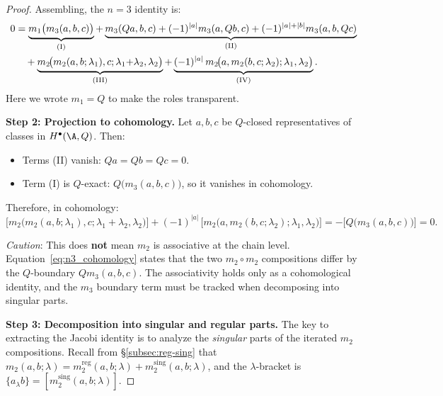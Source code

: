 \begin{proof}
Assembling, the $n=3$ identity is:
\begin{align}
0 &= \underbrace{m_1\bigl(m_3(a,b,c)\bigr)}_{\text{(I)}}
 + \underbrace{m_3(Qa,b,c) + (-1)^{|a|} m_3(a,Qb,c) + (-1)^{|a|+|b|} m_3(a,b,Qc)}_{\text{(II)}} \notag\\
 &\quad + \underbrace{m_2\!\bigl(m_2(a,b;\lambda_1),c;\lambda_1{+}\lambda_2,\lambda_2\bigr)}_{\text{(III)}}
 + \underbrace{(-1)^{|a|}\, m_2\!\bigl(a,m_2(b,c;\lambda_2);\lambda_1,\lambda_2\bigr)}_{\text{(IV)}}.
\end{align}
Here we wrote $m_1 = Q$ to make the roles transparent.

\medskip
\textbf{Step 2: Projection to cohomology.}
Let $a,b,c$ be $Q$-closed representatives of classes in $H^\bullet(\A,Q)$. Then:
\begin{itemize}
\item Terms (II) vanish: $Qa = Qb = Qc = 0$.
\item Term (I) is $Q$-exact: $Q\bigl(m_3(a,b,c)\bigr)$, so it vanishes in cohomology.
\end{itemize}
Therefore, in cohomology:
\begin{equation}
\bigl[m_2\!\bigl(m_2(a,b;\lambda_1),c;\lambda_1{+}\lambda_2,\lambda_2\bigr)\bigr]
+ (-1)^{|a|}\,\bigl[m_2\!\bigl(a,m_2(b,c;\lambda_2);\lambda_1,\lambda_2\bigr)\bigr]
= -\bigl[Q\bigl(m_3(a,b,c)\bigr)\bigr] = 0.
\end{equation}

\emph{Caution}: This does \textbf{not} mean $m_2$ is associative at the
chain level. Equation~\eqref{eq:n3_cohomology} states that the two
$m_2 \circ m_2$ compositions differ by the $Q$-boundary
$Qm_3(a,b,c)$. The associativity holds only as a cohomological
identity, and the $m_3$ boundary term must be tracked when decomposing
into singular parts.

\medskip
\textbf{Step 3: Decomposition into singular and regular parts.}
The key to extracting the Jacobi identity is to analyze the \emph{singular} parts of the iterated $m_2$ compositions. Recall from \S\ref{subsec:reg-sing} that $m_2(a,b;\lambda) = m_2^{\mathrm{reg}}(a,b;\lambda) + m_2^{\mathrm{sing}}(a,b;\lambda)$, and the $\lambda$-bracket is $\{a_\lambda b\} = [m_2^{\mathrm{sing}}(a,b;\lambda)]$.


\end{proof}
